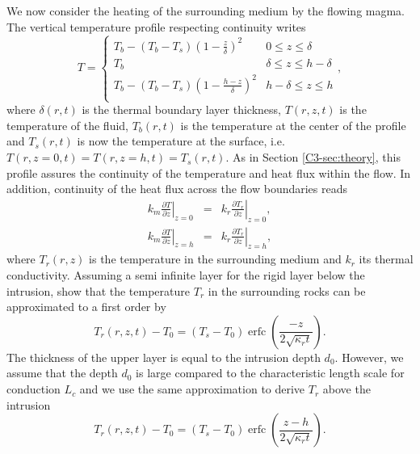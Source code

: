 We now consider  the heating of the surrounding medium  by the flowing
magma.  The vertical temperature profile respecting continuity writes
\begin{equation}
  T=
  \begin{cases}
    T_b - (T_b-T_s)(1-\frac{z}{\delta})^2 & 0 \le z\le \delta \\
    T_b & \delta \le z\le h-\delta \\
    T_b - (T_b-T_s)(1-\frac{h-z}{\delta})^2 & h-\delta \le z\le h\\
  \end{cases},
  \label{C4-Temperature}
\end{equation}
where  $\delta(r,t)$   is  the   thermal  boundary   layer  thickness,
$T(r,z,t)$  is  the  temperature  of  the  fluid,  $T_b(r,t)$  is  the
temperature at  the center of  the profile  and $T_s(r,t)$ is  now the
temperature  at the  surface, i.e.   $T(r,z=0,t)=T(r,z=h,t)=T_s(r,t)$.
As in Section \ref{C3-sec:theory}, this profile assures the continuity
of  the temperature  and  heat  flux within  the  flow.  In  addition,
continuity of the heat flux across the flow boundaries reads
\begin{eqnarray}
  k_m\left.\frac{\partial                                    T}{\partial
  z}\right|_{z=0}&=&k_r\left.\frac{\partial              T_r}{\partial
                     z}\right|_{z=0}  ,\label{C4-Flux1}\\
  k_m\left.\frac{\partial                                  T}{\partial
  z}\right|_{z=h}&=&k_r\left.\frac{\partial            T_r}{\partial
                     z}\right|_{z=h},
                     \label{C4-Flux2}
\end{eqnarray}
where  $T_r(r,z)$ is  the temperature  in the  surrounding medium  and
$k_r$ its  thermal conductivity.  Assuming  a semi infinite  layer for
the rigid layer below  the intrusion, \citet{Carslaw:1959wf} show that
the temperature $T_r$ in the  surrounding rocks can be approximated to
a first order by
\begin{equation}
  T_r(r,z,t)-T_0=(T_{s}-T_0)\operatorname{erfc}{\left(\frac{-z}{2\sqrt{\kappa_r t}}\right)}.
  \label{C4-eq22}
\end{equation}
The  thickness of  the upper  layer is  equal to  the intrusion  depth
$d_0$. However,  we assume that the  depth $d_0$ is large  compared to
the characteristic  length scale for  conduction $L_c$ and we  use the
same approximation to derive $T_r$ above the intrusion
\begin{equation}
  T_r(r,z,t)-T_0=(T_{s}-T_0)\operatorname{erfc}{\left(\frac{z-h}{2\sqrt{\kappa_r t}}\right)}.
  \label{C4-eq11}
\end{equation}
